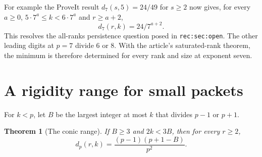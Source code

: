 \documentclass[11pt]{article}
\newtheorem{theorem}{Theorem}[section]
\begin{document}
For example the ProveIt result $d_7(s,5)=24/49$ for $s\ge2$ now gives, for every $a\ge0$, $5\cdot7^a\le k<6\cdot7^a$ and $r\ge a+2$,
\[
                        d_7(r,k)=24/7^{a+2}.
\]
This resolves the all-ranks persistence question posed in \texttt{rec:sec:open}. The other leading digits at $p=7$ divide $6$ or $8$. With the article's saturated-rank theorem, the minimum is therefore determined for every rank and size at exponent seven.
\section{A rigidity range for small packets}
For $k<p$, let $B$ be the largest integer at most $k$ that divides $p-1$ or $p+1$.
\begin{theorem}[The conic range]
If $B\ge3$ and $2k<3B$, then for every $r\ge2$,
\[
 d_p(r,k)=\frac{(p-1)(p+1-B)}{p^2}.
\]
\end{theorem}
\end{document}
